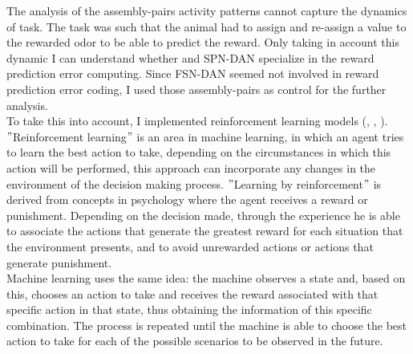 The analysis of the assembly-pairs activity patterns cannot capture the dynamics of task. The task was such that the animal had to assign and re-assign a value to the rewarded odor to be able to predict the reward. Only taking in account this dynamic I can understand whether and SPN-DAN specialize in the reward prediction error computing. Since FSN-DAN seemed not involved in reward prediction error coding, I used those assembly-pairs as control for the further analysis.\\To take this into account, I implemented reinforcement learning models (\cite{RescorlaWagner}, \cite{Sutton}, \cite{SuttonBarto}).\\$"$Reinforcement learning$"$ is an area in machine learning, in which an agent tries to learn the best action to take, depending on the circumstances in which this action will be performed, this approach can incorporate any changes in the environment of the decision making process. $"$Learning by reinforcement$"$ is derived from concepts in psychology where the agent receives a reward or punishment. Depending on the decision made, through the experience he is able to associate the actions that generate the greatest reward for each situation that the environment presents, and to avoid unrewarded actions or actions that generate punishment.\\Machine learning uses the same idea: the machine observes a state and, based on this, chooses an action to take and receives the reward associated with that specific action in that state, thus obtaining the information of this specific combination. The process is repeated until the machine is able to choose the best action to take for each of the possible scenarios to be observed in the future.\\
